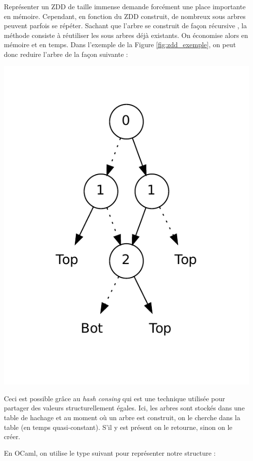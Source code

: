 \documentclass[a4paper]{article}
\begin{document}
Représenter un ZDD de taille immense demande forcément une place importante en 
mémoire. Cependant, en fonction du ZDD construit, de nombreux sous arbres
peuvent parfois se répéter. Sachant que l'arbre se construit de façon récursive
, la méthode consiste à réutiliser les sous 
arbres déjà existants. On économise alors en mémoire
et en temps.
Dans l'exemple de la Figure \ref{fig:zdd_exemple}, on peut donc reduire l'arbre
de la façon suivante : 
\begin{center}
\includegraphics[scale=0.6]{../imports/zdd_construct.pdf}
\end{center}

Ceci est possible grâce au \emph{hash consing} qui est une
technique utilisée pour partager des valeurs structurellement égales. Ici,
les arbres sont stockés dans une table de hachage et au moment où un arbre est 
construit, on le cherche dans la table (en temps quasi-constant). S'il y est 
présent on le retourne, sinon on le créer.

En OCaml, on utilise le type suivant pour représenter notre structure : 
\end{document}
